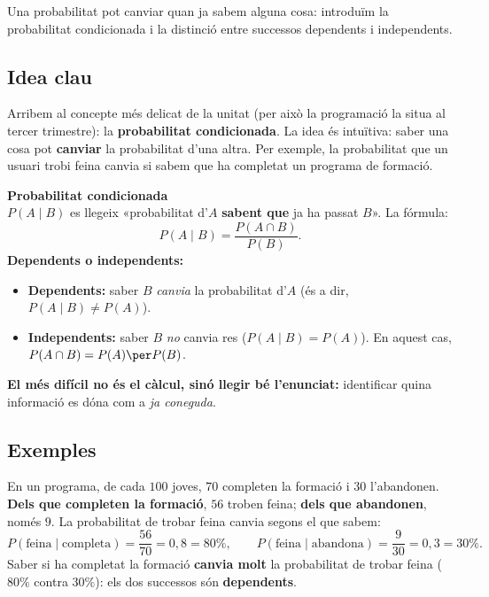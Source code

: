 %
{Una probabilitat pot canviar quan ja sabem alguna cosa: introduïm la probabilitat condicionada i la distinció entre successos dependents i independents.}

\subsection{Idea clau}

Arribem al concepte més delicat de la unitat (per això la programació la situa al
tercer trimestre): la \textbf{probabilitat condicionada}. La idea és intuïtiva: saber
una cosa pot \textbf{canviar} la probabilitat d'una altra. Per exemple, la probabilitat
que un usuari trobi feina canvia si sabem que ha completat un programa de formació.

\begin{idea}
\textbf{Probabilitat condicionada}\\
$P(A\mid B)$ es llegeix «probabilitat d'$A$ \textbf{sabent que} ja ha passat $B$». La
fórmula:
\[
P(A\mid B)=\frac{P(A\cap B)}{P(B)}.
\]
\textbf{Dependents o independents:}
\begin{itemize}[leftmargin=1.4em, itemsep=2pt]
  \item \textbf{Dependents:} saber $B$ \emph{canvia} la probabilitat d'$A$ (és a dir,
        $P(A\mid B)\neq P(A)$).
  \item \textbf{Independents:} saber $B$ \emph{no} canvia res ($P(A\mid B)=P(A)$). En
        aquest cas, $P(A\cap B)=P(A)\per P(B)$.
\end{itemize}
\textbf{El més difícil no és el càlcul, sinó llegir bé l'enunciat:} identificar quina
informació es dóna com a \emph{ja coneguda}.
\end{idea}

\subsection{Exemples}

\begin{exemple}
En un programa, de cada $100$ joves, $70$ completen la formació i $30$ l'abandonen.
\textbf{Dels que completen la formació}, $56$ troben feina; \textbf{dels que
abandonen}, només $9$. La probabilitat de trobar feina canvia segons el que sabem:
\[
P(\text{feina}\mid\text{completa})=\frac{56}{70}=0,8=80\%,\qquad
P(\text{feina}\mid\text{abandona})=\frac{9}{30}=0,3=30\%.
\]
Saber si ha completat la formació \textbf{canvia molt} la probabilitat de trobar feina
($80\%$ contra $30\%$): els dos successos són \textbf{dependents}.
\end{exemple}

